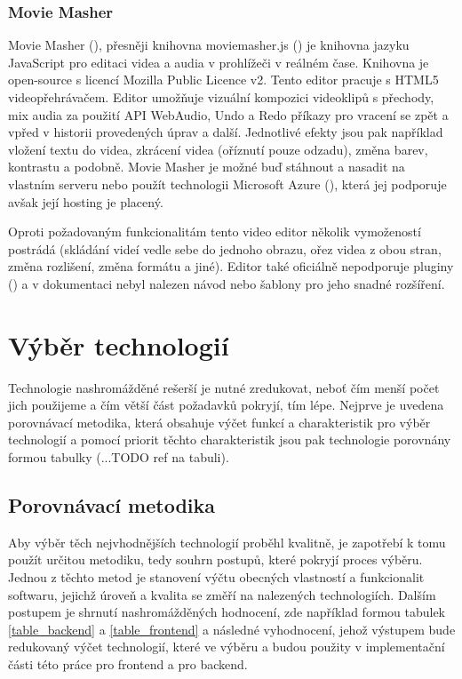 \documentclass[thesis=M,czech]{FITthesis}[2012/06/26]
\begin{document}
\subsubsection{Movie Masher} \label{subsubsec:analyza_reseni_mm}
Movie Masher (\cite{mm}), přesněji knihovna moviemasher.js (\cite{mm_js}) je knihovna jazyku JavaScript pro editaci videa a audia v prohlížeči v reálném čase. Knihovna je open-source s licencí Mozilla Public Licence v2. Tento editor pracuje s HTML5 videopřehrávačem. Editor umožňuje vizuální kompozici videoklipů s přechody, mix audia za použití API WebAudio, Undo a Redo příkazy pro vracení se zpět a vpřed v historii provedených úprav a další. Jednotlivé efekty jsou pak například vložení textu do videa, zkrácení videa (oříznutí pouze odzadu), změna barev, kontrastu a podobně. Movie Masher je možné buď stáhnout a nasadit na vlastním serveru nebo použít technologii Microsoft Azure (\cite{mm_azure}), která jej podporuje avšak její hosting je placený.
	
	Oproti požadovaným funkcionalitám tento video editor několik vymožeností postrádá (skládání videí vedle sebe do jednoho obrazu, ořez videa z obou stran, změna rozlišení, změna formátu a jiné). Editor také oficiálně nepodporuje pluginy (\cite{mm_azure}) a v dokumentaci nebyl nalezen návod nebo šablony pro jeho snadné rozšíření. 



\section{Výběr technologií} \label{sec:analyza_technologie}
Technologie nashromážděné rešerší je nutné zredukovat, neboť čím menší počet jich použijeme a čím větší část požadavků pokryjí, tím lépe. Nejprve je uvedena porovnávací metodika, která obsahuje výčet funkcí a charakteristik pro výběr technologií a pomocí priorit těchto charakteristik jsou pak technologie porovnány formou tabulky (...TODO ref na tabuli).

\subsection{Porovnávací metodika} \label{subsec:analyza_technologie_metodika}
Aby výběr těch nejvhodnějších technologií proběhl kvalitně, je zapotřebí k tomu použít určitou metodiku, tedy souhrn postupů, které pokryjí proces výběru. Jednou z těchto metod je stanovení výčtu obecných vlastností a funkcionalit softwaru, jejichž úroveň a kvalita se změří na nalezených technologiích. Dalším postupem je shrnutí nashromážděných hodnocení, zde například formou tabulek \ref{table_backend} a \ref{table_frontend} a následné vyhodnocení, jehož výstupem bude redukovaný výčet technologií, které ve výběru  a budou použity v implementační části této práce pro frontend a pro backend.
	
\end{document}
